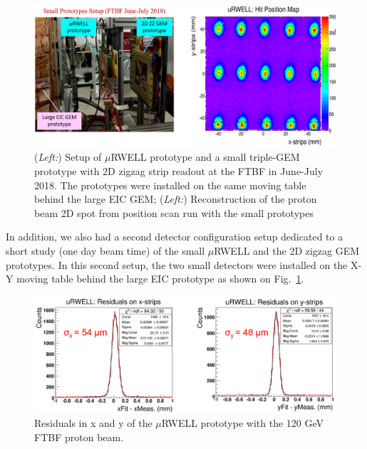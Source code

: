 \begin{figure}[htb]
\includegraphics[width=1\columnwidth,trim={0pt 0mm 0pt 0mm},clip]{UVa_plots/ftbfSmallSetup}
\caption{\label{fig:ftbfSmallSetup} ({\it Left:}) Setup of $\mu$RWELL  prototype and a small triple-GEM prototype with 2D zigzag strip readout at the FTBF in June-July 2018. The prototypes were installed on the same moving table behind the large EIC GEM; ({\it Left:}) Reconstruction of the proton beam 2D spot from position scan run with the small prototypes}
\end{figure}
%
In addition, we also had a second detector configuration setup dedicated to a short study (one day beam time) of the small  $\mu$RWELL and the 2D zigzag GEM prototypes. In this second setup, the two small detectors were installed on the X-Y moving table behind the large EIC prototype as shown on Fig.~\ref{fig:ftbfSmallSetup}.\\
%
\begin{figure}[htb]
\centering
\includegraphics[width=1\columnwidth,trim={0pt 0mm 0pt 0mm},clip]{UVa_plots/uRwellResidual}
\caption{\label{fig:uRwellResidual} Residuals in x and y of the $\mu$RWELL prototype with the 120 GeV FTBF proton beam.}
\end{figure}
%
